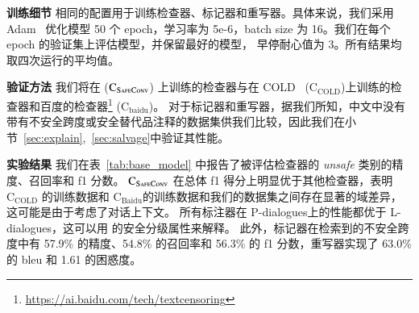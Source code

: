 \noindent\textbf{训练细节 } 相同的配置用于训练检查器、标记器和重写器。具体来说，我们采用 Adam~\cite{loshchilov2017decoupled} 优化模型 50 个 epoch，学习率为 5e-6，batch size 为 16。我们在每个 epoch 的验证集上评估模型，并保留最好的模型， 早停耐心值为 3。所有结果均取四次运行的平均值。

\noindent\textbf{验证方法 } 我们将在 \data{} ($\textrm{C}_{\textsc{SafeConv}}$) 上训练的检查器与在 COLD~\cite{deng2022cold} ($\textrm{C}_{\textrm{COLD}}$)上训练的检查器和百度的检查器\footnote{\href{https://ai.baidu.com/tech/textcensoring}{https://ai.baidu.com/tech/textcensoring}} ($\textrm{C}_{\textrm{baidu}}$)。 对于标记器和重写器，据我们所知，中文中没有带有不安全跨度或安全替代品注释的数据集供我们比较，因此我们在小节~\ref{sec:explain},~\ref{sec:salvage}中验证其性能。

\noindent\textbf{实验结果 } 我们在表~\ref{tab:base_model} 中报告了被评估检查器的 \textit{unsafe} 类别的精度、召回率和 f1 分数。 $\textrm{C}_{\textsc{SafeConv}}$ 在总体 f1 得分上明显优于其他检查器，表明 $\textrm{C}_{\textrm{COLD}}$ 的训练数据和 $\textrm{C}_{\textrm{Baidu}}$的训练数据和我们的数据集之间存在显著的域差异，这可能是由于\data{}考虑了对话上下文。 所有标注器在 P-dialogues上的性能都优于 L-dialogues，这可以用 \data{} 的安全分级属性来解释。 此外，标记器在检索到的不安全跨度中有 57.9\% 的精度、54.8\% 的召回率和 56.3\% 的 f1 分数，重写器实现了 63.0\% 的 bleu 和 1.61 的困惑度。

